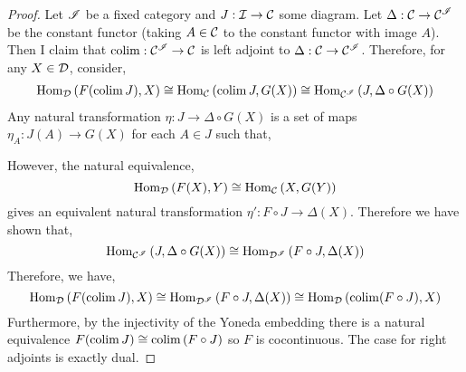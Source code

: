 \documentclass[12pt]{article}
\begin{document}
\begin{proof}
Let $\mathscr{I}$ be a fixed category and $J : \mathcal{I} \to \mathcal{C}$ some diagram. Let $\Delta : \mathcal{C} \to \mathcal{C}^{\mathscr{I}}$ be the constant functor (taking $A \in \mathcal{C}$ to the constant functor with image $A$). Then I claim that $\operatorname{\mathrm{colim}} : \mathcal{C}^{\mathscr{I}} \to \mathcal{C}$ is left adjoint to $\Delta : \mathcal{C} \to \mathcal{C}^{\mathscr{I}}$. Therefore, for any $X \in \mathcal{D}$, consider,
\begin{align*}
\mathrm{Hom}_{\mathcal{D}} \left( F(\operatorname{\mathrm{colim}}{J}), X \right) \cong \mathrm{Hom}_{\mathcal{C}} \left( \operatorname{\mathrm{colim}}{J}, G(X) \right) \cong \mathrm{Hom}_{\mathcal{C}^{\mathscr{I}}} \left( J, \Delta \circ G(X) \right)
\end{align*} 
Any natural transformation $\eta : J \to \Delta \circ G(X)$ is a set of maps $\eta_A : J(A) \to G(X)$ for each $A \in J$ such that,
\begin{center}
\end{center}
However, the natural equivalence,
\[ \mathrm{Hom}_{\mathcal{D}} \left( F(X), Y \right) \cong \mathrm{Hom}_{\mathcal{C}} \left( X, G(Y) \right) \]
gives an equivalent natural transformation $\eta' : F \circ J \to \Delta(X)$. Therefore we have shown that,
\[ \mathrm{Hom}_{\mathcal{C}^{\mathscr{I}}} \left( J, \Delta \circ G(X) \right) \cong \mathrm{Hom}_{\mathcal{D}^{\mathscr{I}}} \left( F \circ J, \Delta(X) \right) \]
Therefore, we have,
\[ \mathrm{Hom}_{\mathcal{D}} \left( F(\operatorname{\mathrm{colim}}{J}), X \right) \cong \mathrm{Hom}_{\mathcal{D}^{\mathscr{I}}} \left( F \circ J, \Delta(X) \right) \cong \mathrm{Hom}_{\mathcal{D}} \left( \operatorname{\mathrm{colim}}(F \circ J), X \right) \]
Furthermore, by the injectivity of the Yoneda embedding there is a natural equivalence $F(\operatorname{\mathrm{colim}} J) \cong \operatorname{\mathrm{colim}}{(F \circ J)}$ so $F$ is cocontinuous. The case for right adjoints is exactly dual.  
\end{proof}
\end{document}
